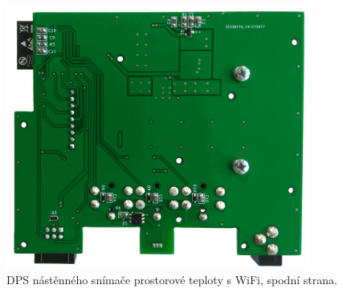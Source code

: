 \begin{figure}[H]
    \centering
    \includegraphics[width=0.89\textwidth]{images/nastenny-snimac-prostorove-teploty-wifi/dps-nastenny-snimac-prostorove-teploty-wifi-spodni-cast.png}
    \caption{DPS nástěnného snímače prostorové teploty s WiFi, spodní strana.}
    \label{fig:dps-nastenny-snimac-prostorove-teploty-wifi-spodni-cast}
\end{figure}
